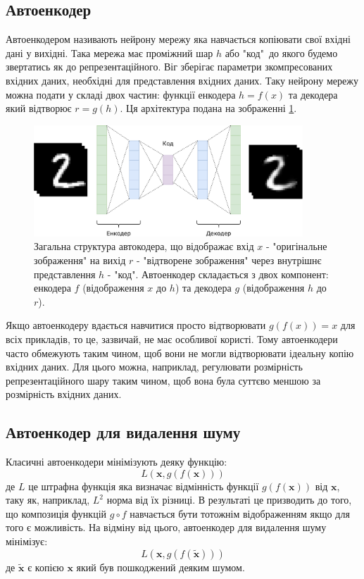 \documentclass[14pt,a4paper]{extarticle}
\newcounter{e}
\numberwithin{equation}{section}
\numberwithin{figure}{section}
\begin{document}
	\subsection{Автоенкодер}
	
	Автоенкодером називають нейрону мережу яка навчається копіювати свої вхідні дані у вихідні. Така мережа має проміжний шар $h$ або "код"\, до якого будемо звертатись як до репрезентаційного. Віг зберігає параметри зкомпресованих вхідних даних, необхідні для представлення вхідних даних. Таку нейрону мережу можна подати у складі двох частин: функції енкодера $h = f(x)$ та декодера який відтворює $r = g(h)$. Ця архітектура подана на зображенні \ref*{fig:autoencoder-graph}.
	\begin{figure}[H]
		\centering
		\includegraphics[width=0.9\textwidth]{../resources/autoencoder.pdf}
		\caption{Загальна структура автокодера, що відображає вхід $x$ - "оригінальне зображення" на вихід $r$ - "відтворене зображення" через внутрішнє представлення $h$ - "код". Автоенкодер складається з двох компонент: енкодера $f$ (відображення $x$ до $h$) та декодера $g$ (відображення $h$ до $r$).}
		\label{fig:autoencoder-graph}
	\end{figure}
	Якщо автоенкодеру вдається навчитися просто відтворювати $g(f(x)) = x$ для всіх прикладів, то це, зазвичай, не має особливої користі. Тому автоенкодери часто обмежують таким чином, щоб вони не могли відтворювати ідеальну копію вхідних даних. Для цього можна, наприклад, регулювати розмірність репрезентаційного шару таким чином, щоб вона була суттєво меншою за розмірність вхідних даних.
	
	\newpage
	\subsection{Автоенкодер для видалення шуму}
	Класичні автоенкодери мінімізують деяку функцію:
	\begin{equation}
		L(\boldsymbol{x}, g(f(\boldsymbol{x})))
	\end{equation}
	де $L$ це штрафна функція яка визначає відмінність функції $g(f(\boldsymbol{x}))$ від $\boldsymbol{x}$, таку як, наприклад,  $L^{2}$ норма від їх різниці. В результаті це призводить до того, що композиція функцій $g \circ f$ навчається бути тотожнім відображенням якщо для того є можливість. На відміну від цього, автоенкодер для видалення шуму мінімізує:
	\begin{equation}
		L(\boldsymbol{x}, g(f(\tilde{\boldsymbol{x}})))
	\end{equation}
	де $\tilde{\boldsymbol{x}}$ є копією $\boldsymbol{x}$ який був пошкоджений деяким шумом. 
		
\end{document}
